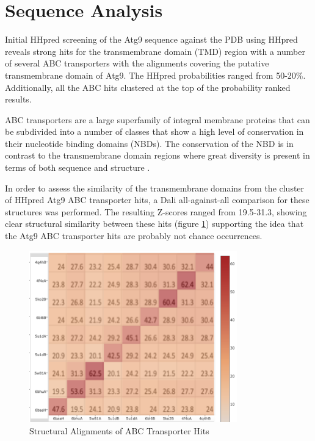 \section{Sequence Analysis}
Initial HHpred screening of the Atg9 sequence against the PDB \cite{Burley2018} using HHpred \cite{Zimmermann2018} reveals strong hits for the transmembrane domain (TMD) region with a number of several ABC transporters with the alignments covering the putative transmembrane domain of Atg9. The HHpred probabilities ranged from 50-20\%.  Additionally, all the ABC hits clustered at the top of the probability ranked results.

ABC transporters are a large superfamily \cite{rees2009abc} of integral membrane proteins that can be subdivided into a number of classes that show a high level of conservation in their nucleotide binding domains (NBDs).  The conservation of the NBD is in contrast to the transmembrane domain regions where great diversity is present in terms of both sequence and structure \cite{rees2009abc}. 

In order to assess the similarity of the transmembrane domains from the cluster of HHpred Atg9 ABC transporter hits, a Dali \cite{Holm2016} all-against-all comparison for these structures was performed.  The resulting Z-scores ranged from 19.5-31.3, showing clear structural similarity between these hits (figure \ref{fig:abc_comp}) supporting the idea that the Atg9 ABC transporter hits are probably not chance occurrences. 

\begin{figure}[th!]
    \centering
    \includegraphics[width=90mm, scale=0.9]{Modelling of Atg9/abc_fold_comparison.png}
    \caption{Structural Alignments of ABC Transporter Hits}
    \label{fig:abc_comp}
    \small
\end{figure}


